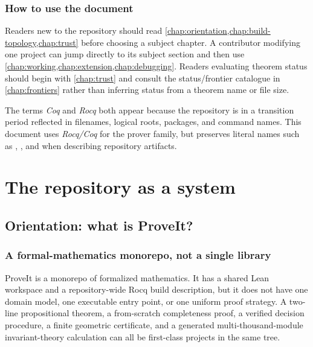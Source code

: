 \documentclass[
  10pt,
  a4paper,
  twoside,
  open=any,
  parskip=half,
  headings=big
]{scrreprt}
\newcommand{\code}[1]{\texttt{\detokenize{#1}}}
\begin{document}
\section*{How to use the document}

Readers new to the repository should read \cref{chap:orientation,chap:build-topology,chap:trust}
before choosing a subject chapter.  A contributor modifying one project can
jump directly to its subject section and then use
\cref{chap:working,chap:extension,chap:debugging}.  Readers evaluating theorem
status should begin with \cref{chap:trust} and consult the status/frontier
catalogue in \cref{chap:frontiers} rather than inferring status from a theorem
name or file size.

The terms \emph{Coq} and \emph{Rocq} both appear because the repository is in a
transition period reflected in filenames, logical roots, packages, and command
names.  This document uses \emph{Rocq/Coq} for the prover family, but preserves
literal names such as \code{_CoqProject}, \code{coqc}, and \code{Coq/} when
describing repository artifacts.

\cleardoublepage
{}
\tableofcontents
\cleardoublepage
\listoffigures
{}
\listoftables
{}

\part{The repository as a system}

\chapter{Orientation: what is ProveIt?}
\label{chap:orientation}

\section{A formal-mathematics monorepo, not a single library}

ProveIt is a monorepo of formalized mathematics.  It has a shared Lean
workspace and a repository-wide Rocq build description, but it does not have
one domain model, one executable entry point, or one uniform proof strategy.
A two-line propositional theorem, a from-scratch completeness proof, a verified
decision procedure, a finite geometric certificate, and a generated
multi-thousand-module invariant-theory calculation can all be first-class
projects in the same tree.
\end{document}

